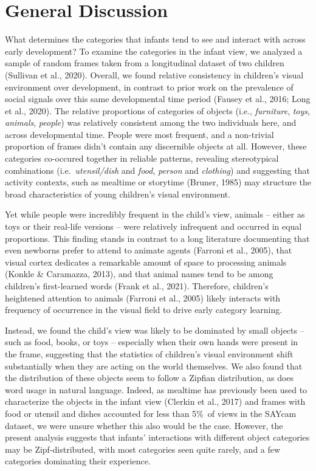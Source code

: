\documentclass[10pt, letterpaper]{article}
\begin{document}
\hypertarget{general-discussion}{%
\section{General Discussion}\label{general-discussion}}

What determines the categories that infants tend to see and interact
with across early development? To examine the categories in the infant
view, we analyzed a sample of random frames taken from a longitudinal
dataset of two children (Sullivan et al., 2020). Overall, we found
relative consistency in children's visual environment over development,
in contrast to prior work on the prevalence of social signals over this
same developmental time period (Fausey et al., 2016; Long et al., 2020).
The relative proportions of categories of objects (i.e.,
\emph{furniture}, \emph{toys}, \emph{animals}, \emph{people}) was
relatively consistent among the two individuals here, and across
developmental time. People were most frequent, and a non-trivial
proportion of frames didn't contain any discernible objects at all.
However, these categories co-occured together in reliable patterns,
revealing stereotypical combinations (i.e.~\emph{utensil/dish} and
\emph{food}, \emph{person} and \emph{clothing}) and suggesting that
activity contexts, such as mealtime or storytime (Bruner, 1985) may
structure the broad characteristics of young children's visual
environment.

Yet while people were incredibly frequent in the child's view, animals
-- either as toys or their real-life versions -- were relatively
infrequent and occurred in equal proportions. This finding stands in
contrast to a long literature documenting that even newborns prefer to
attend to animate agents (Farroni et al., 2005), that visual cortex
dedicates a remarkable amount of space to processing animals (Konkle \&
Caramazza, 2013), and that animal names tend to be among children's
first-learned words (Frank et al., 2021). Therefore, children's
heightened attention to animals (Farroni et al., 2005) likely interacts
with frequency of occurrence in the visual field to drive early category
learning.

Instead, we found the child's view was likely to be dominated by small
objects -- such as food, books, or toys -- especially when their own
hands were present in the frame, suggesting that the statistics of
children's visual environment shift substantially when they are acting
on the world themselves. We also found that the distribution of these
objects seem to follow a Zipfian distribution, as does word usage in
natural language. Indeed, as mealtime has previously been used to
characterize the objects in the infant view (Clerkin et al., 2017) and
frames with food or utensil and dishes accounted for less than 5\%~of
views in the SAYcam dataset, we were unsure whether this also would be
the case. However, the present analysis suggests that infants'
interactions with different object categories may be Zipf-distributed,
with most categories seen quite rarely, and a few categories dominating
their experience.
\end{document}
